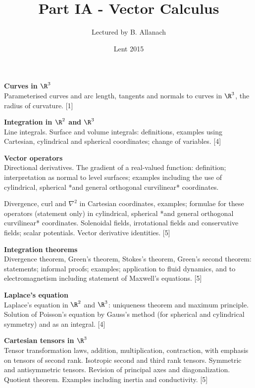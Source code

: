 \documentclass[a4paper]{article}
\title{Part IA - Vector Calculus}
\author{Lectured by B. Allanach}
\date{Lent 2015}
\begin{document}
\maketitle
{\small
  \noindent\textbf{Curves in $\R^3$}\\ 
  Parameterised curves and arc length, tangents and normals to curves in $\R^3$, the radius of curvature.\hspace*{\fill} [1]

  \vspace{10pt}
  \noindent\textbf{Integration in $\R^2$ and $\R^3$}\\
  Line integrals. Surface and volume integrals: definitions, examples using Cartesian, cylindrical and spherical coordinates; change of variables.\hspace*{\fill} [4]

  \vspace{10pt}
  \noindent\textbf{Vector operators}\\
  Directional derivatives. The gradient of a real-valued function: definition; interpretation as normal to level surfaces; examples including the use of cylindrical, spherical *and general orthogonal curvilinear* coordinates.

  \vspace{5pt}
  \noindent Divergence, curl and $\nabla^2$ in Cartesian coordinates, examples; formulae for these operators (statement only) in cylindrical, spherical *and general orthogonal curvilinear* coordinates. Solenoidal fields, irrotational fields and conservative fields; scalar potentials. Vector derivative identities.\hspace*{\fill} [5]

  \vspace{10pt}
  \noindent\textbf{Integration theorems}\\
  Divergence theorem, Green's theorem, Stokes's theorem, Green's second theorem: statements; informal proofs; examples; application to fluid dynamics, and to electromagnetism including statement of Maxwell's equations.\hspace*{\fill} [5]

  \vspace{10pt}
  \noindent\textbf{Laplace's equation}\\
  Laplace's equation in $\R^2$ and $\R^3$: uniqueness theorem and maximum principle. Solution of Poisson's equation by Gauss's method (for spherical and cylindrical symmetry) and as an integral.\hspace*{\fill} [4]

  \vspace{10pt}
  \noindent\textbf{Cartesian tensors in $\R^3$}\\
  Tensor transformation laws, addition, multiplication, contraction, with emphasis on tensors of second rank. Isotropic second and third rank tensors. Symmetric and antisymmetric tensors. Revision of principal axes and diagonalization. Quotient theorem. Examples including inertia and conductivity.\hspace*{\fill} [5]}
\end{document}

